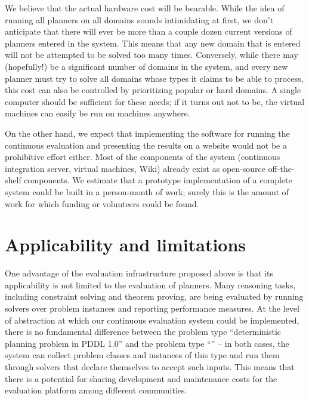 We believe that the actual hardware cost will be bearable.  While the
idea of running all planners on all domains sounds intimidating at
first, we don't anticipate that there will ever be more than a couple
dozen current versions of planners entered in the system.  This means
that any new domain that is entered will not be attempted to be solved
too many times.  Conversely, while there may (hopefully!) be a
significant number of domains in the system, and every new planner
must try to solve all domains whose types it claims to be able to
process, this cost can also be controlled by prioritizing popular or
hard domains.  A single computer should be sufficient for these needs;
if it turns out not to be, the virtual machines can easily be run on
machines anywhere.

On the other hand, we expect that implementing the software for
running the continuous evaluation and presenting the results on a
website would not be a prohibitive effort either.  Most of the
components of the system (continuous integration server, virtual
machines, Wiki) already exist as open-source off-the-shelf
components.  We estimate that a prototype implementation of a complete
system could be built in a person-month of work; surely this is the
amount of work for which funding or volunteers could be found.






\section{Applicability and limitations}

One advantage of the evaluation infrastructure proposed above is that
its applicability is not limited to the evaluation of planners.
Many reasoning tasks, including constraint solving and theorem proving, are
being evaluated by running solvers over problem instances and reporting
performance measures.  At the level of abstraction at which our continuous
evaluation system could be implemented, there is no fundamental difference
between the problem type ``deterministic planning problem in PDDL 1.0'' and
the problem type ``'' -- in both cases,
the system can collect problem classes and instances of this type and run
them through solvers that declare themselves to accept such inputs.  This
means that there is a potential for sharing development and maintenance
costs for the evaluation platform among different communities.

